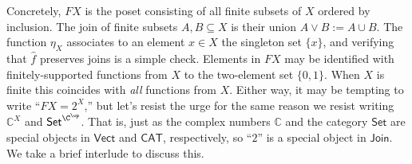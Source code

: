 Concretely, $FX$ is the poset consisting of all finite subsets of $X$ ordered by inclusion.
The join of finite subsets $A,B\subseteq X$ is their union $A\vee B:=A\cup B.$ The function $\eta_X$ associates to an element $x\in X$ the singleton set $\{x\}$, and verifying that $\hat f$ preserves joins is a simple check. Elements in $FX$ may be identified with finitely-supported functions from $X$ to the two-element set $\{0,1\}$. When $X$ is finite this coincides with \textit{all} functions from $X$. Either way, it may be tempting to write ``$FX=2^X$,'' but let's resist the urge  for the same reason we resist writing $\mathbb{C}^X$ and $\mathsf{Set}^{\C^{\op}}$. That is, just as the complex numbers $\mathbb{C}$ and the category $\mathsf{Set}$ are special objects in $\mathsf{Vect}$ and $\mathsf{CAT}$, respectively, so ``$2$'' is a special object in $\mathsf{Join}$. We take a brief interlude to discuss this.


